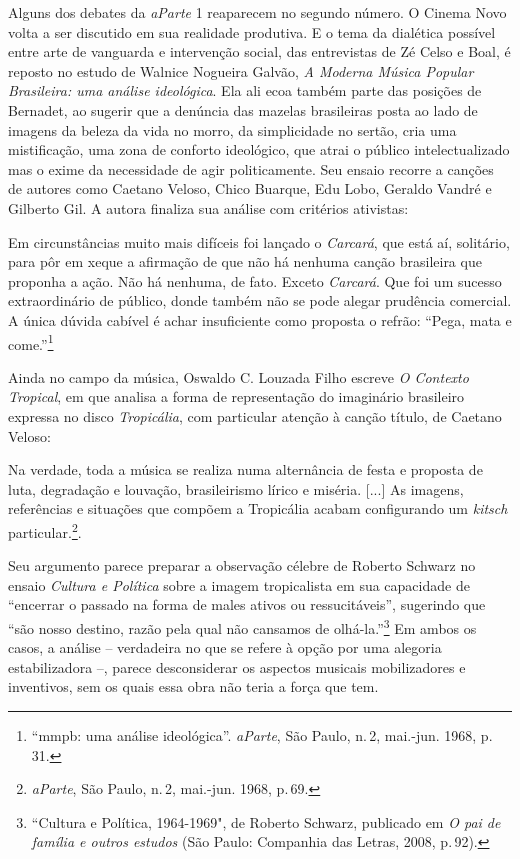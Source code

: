 Alguns dos debates da {\it aParte} 1 reaparecem no segundo número. O
Cinema Novo volta a ser discutido em sua realidade produtiva. E o tema
da dialética possível entre arte de vanguarda e intervenção social, das
entrevistas de Zé Celso e Boal, é reposto no estudo de Walnice Nogueira
Galvão, {\it A Moderna Música Popular Brasileira: uma análise
ideológica}. Ela ali ecoa também parte das posições de Bernadet, ao
sugerir que a denúncia das mazelas brasileiras posta ao lado de imagens
da beleza da vida no morro, da simplicidade no sertão, cria uma
mistificação, uma zona de conforto ideológico, que atrai o público
intelectualizado mas o exime da necessidade de agir politicamente. Seu
ensaio recorre a canções de autores como Caetano Veloso, Chico Buarque,
Edu Lobo, Geraldo Vandré e Gilberto Gil. A autora finaliza sua análise
com critérios ativistas:

\startblockquote
Em circunstâncias muito mais difíceis foi lançado o {\it Carcará}, que
está aí, solitário, para pôr em xeque a afirmação de que não há nenhuma
canção brasileira que proponha a ação. Não há nenhuma, de fato. Exceto
{\it Carcará}. Que foi um sucesso extraordinário de público, donde
também não se pode alegar prudência comercial. A única dúvida cabível é
achar insuficiente como proposta o refrão: “Pega, mata e
come.”\footnote{“{\sc mmpb}: uma análise ideológica”. {\it aParte}, São Paulo,
  n.\,2, mai.-jun. 1968, p.\,31.}
\stopblockquote

Ainda no campo da música, Oswaldo C. Louzada Filho escreve {\it O
Contexto Tropical}, em que analisa a forma de representação do
imaginário brasileiro expressa no disco {\it Tropicália}, com particular
atenção à canção título, de Caetano Veloso:

\startblockquote
Na verdade, toda a música se realiza numa alternância de festa e
proposta de luta, degradação e louvação, brasileirismo lírico e miséria.
{[}...{]} As imagens, referências e situações que compõem a Tropicália
acabam configurando um {\it kitsch} particular.\footnote{{\it aParte},
  São Paulo, n.\,2, mai.-jun. 1968, p.\,69.}.
\stopblockquote

Seu argumento parece preparar a observação célebre de Roberto Schwarz no
ensaio {\it Cultura e Política} sobre a imagem tropicalista em sua
capacidade de “encerrar o passado na forma de males ativos ou
ressucitáveis”, sugerindo que “são nosso destino, razão pela qual não
cansamos de olhá-la.”\footnote{“Cultura e Política, 1964-1969", de
  Roberto Schwarz, publicado em {\it O pai de família e outros estudos}
  (São Paulo: Companhia das Letras, 2008, p.\,92).} Em ambos os casos, a
análise -- verdadeira no que se refere à opção por uma alegoria
estabilizadora --, parece desconsiderar os aspectos musicais
mobilizadores e inventivos, sem os quais essa obra não teria a força que
tem.

